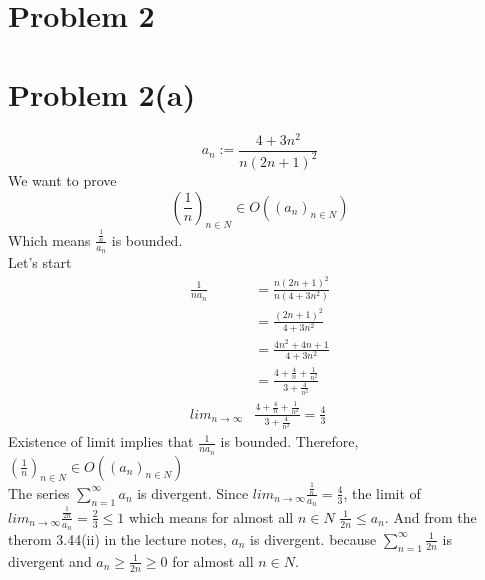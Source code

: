\documentclass{article}
\begin{document}
\section*{Problem 2}
\section*{Problem 2(a)}
\[
   a_n := \frac{4 + 3n^2}{n(2n+1)^2}
\]
We want to prove
\[
   (\frac{1}{n})_{n \in N} \in O((a_n)_{n \in N})
\]
Which means \(\frac{\frac{1}{n}}{a_n}\) is bounded. \\
Let's start
\begin{align*}
   \frac{1}{na_n} &= \frac{n(2n+1)^2}{n(4 + 3n^2)} \\
                  &= \frac{(2n+1)^2}{4 + 3n^2} \\
                  &= \frac{4n^2 + 4n + 1}{4 + 3n^2} \\
                  &= \frac{4 + \frac{4}{n} + \frac{1}{n^2}}{3 + \frac{4}{n^2}} \\
   lim_{n \rightarrow \infty} & \frac{4 + \frac{4}{n} + \frac{1}{n^2}}{3 + \frac{4}{n^2}} = \frac{4}{3}
\end{align*}
Existence of limit implies that \(\frac{1}{na_n}\) is bounded. Therefore, \((\frac{1}{n})_{n \in N} \in O((a_n)_{n \in N})\) \\
The series \(\sum_{n=1}^{\infty} a_n\) is divergent. Since \(lim_{n \rightarrow \infty} \frac{\frac{1}{n}}{a_n} = \frac{4}{3}\), 
the limit of \(lim_{n \rightarrow \infty} \frac{\frac{1}{2n}}{a_n} = \frac{2}{3} \leq 1\) 
which means for almost all \(n \in N\) \(\frac{1}{2n} \leq a_n\). And from the therom 3.44(ii) in the lecture notes,
\(a_n\) is divergent. because \(\sum_{n=1}^{\infty}\frac{1}{2n}\) is divergent and \(a_n \geq \frac{1}{2n} \geq 0\) for almost all \(n \in N\).
\end{document}
